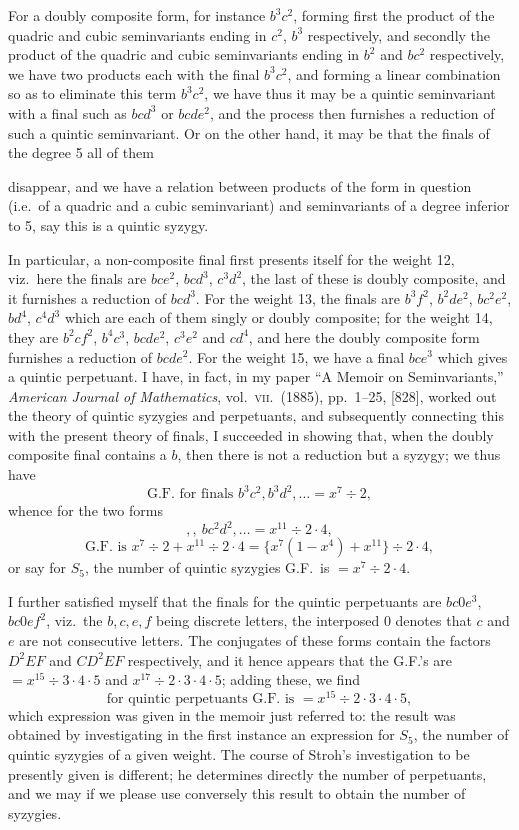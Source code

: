 \documentclass[11pt]{article}
\begin{document}
For a doubly composite form, for instance $b^3c^2$, forming first the product of the quadric and cubic seminvariants ending in $c^2$, $b^3$ respectively, and secondly the product of the quadric and cubic seminvariants ending in $b^2$ and $bc^2$ respectively, we have two products each with the final $b^3c^2$, and forming a linear combination so as to eliminate this term $b^3c^2$, we have thus it may be a quintic seminvariant with a final such as $bcd^3$ or $bcde^2$, and the process then furnishes a reduction of such a quintic seminvariant. Or on the other hand, it may be that the finals of the degree 5 all of them

\clearpage
disappear, and we have a relation between products of the form in question (i.e.\ of a quadric and a cubic seminvariant) and seminvariants of a degree inferior to 5, say this is a quintic syzygy.

In particular, a non-composite final first presents itself for the weight 12, viz.\ here the finals are $bce^2$, $bcd^3$, $c^3d^2$, the last of these is doubly composite, and it furnishes a reduction of $bcd^3$. For the weight 13, the finals are $b^3f^2$, $b^2de^2$, $bc^2e^2$, $bd^4$, $c^4d^3$ which are each of them singly or doubly composite; for the weight 14, they are $b^2cf^2$, $b^4c^3$, $bcde^2$, $c^3e^2$ and $cd^4$, and here the doubly composite form furnishes a reduction of $bcde^2$. For the weight 15, we have a final $bce^3$ which gives a quintic perpetuant. I have, in fact, in my paper ``A Memoir on Seminvariants,'' \textit{American Journal of Mathematics}, vol.\ \textsc{vii}.\ (1885), pp.\ 1--25, [828], worked out the theory of quintic syzygies and perpetuants, and subsequently connecting this with the present theory of finals, I succeeded in showing that, when the doubly composite final contains a $b$, then there is not a reduction but a syzygy; we thus have
\[
\text{G.F.\ for finals } b^3c^2, b^3d^2, \ldots = x^7 \div 2,
\]
whence for the two forms
\[
,, \ bc^2d^2, \ldots = x^{11} \div 2 \cdot 4,
\]
\[
\text{G.F.\ is } x^7 \div 2 + x^{11} \div 2 \cdot 4 = \{x^7 (1 - x^4) + x^{11}\} \div 2 \cdot 4,
\]
or say for $S_5$, the number of quintic syzygies G.F.\ is $= x^7 \div 2 \cdot 4$.

I further satisfied myself that the finals for the quintic perpetuants are $bc0e^3$, $bc0ef^2$, viz.\ the $b, c, e, f$ being discrete letters, the interposed $0$ denotes that $c$ and $e$ are not consecutive letters. The conjugates of these forms contain the factors $D^2EF$ and $CD^2EF$ respectively, and it hence appears that the G.F.'s are $= x^{15} \div 3 \cdot 4 \cdot 5$ and $x^{17} \div 2 \cdot 3 \cdot 4 \cdot 5$; adding these, we find
\[
\text{for quintic perpetuants G.F.\ is } = x^{15} \div 2 \cdot 3 \cdot 4 \cdot 5,
\]
which expression was given in the memoir just referred to: the result was obtained by investigating in the first instance an expression for $S_5$, the number of quintic syzygies of a given weight. The course of Stroh's investigation to be presently given is different; he determines directly the number of perpetuants, and we may if we please use conversely this result to obtain the number of syzygies.
\end{document}
